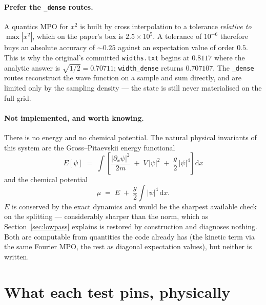 \documentclass[11pt,a4paper]{article}
\newcommand{\code}[1]{\texttt{#1}}
\newcommand{\dd}{\mathrm{d}}
\begin{document}
\paragraph{Prefer the \code{\_dense} routes.}
A quantics MPO for $x^2$ is built by cross interpolation to a tolerance
\emph{relative to} $\max|x^2|$, which on the paper's box is $2.5\times10^5$. A
tolerance of $10^{-6}$ therefore buys an absolute accuracy of ${\sim}0.25$ against an
expectation value of order $0.5$. This is why the original's committed
\code{widths.txt} begins at $0.8117$ where the analytic answer is
$\sqrt{1/2} = 0.70711$; \code{width\_dense} returns $0.707107$. The \code{\_dense}
routes reconstruct the wave function on a sample and sum directly, and are limited
only by the sampling density --- the state is still never materialised on the full
grid.

\paragraph{Not implemented, and worth knowing.}
There is no energy and no chemical potential. The natural physical invariants of this
system are the Gross--Pitaevskii energy functional
\begin{equation}
  E[\psi] \;=\; \int \left[ \frac{|\partial_x \psi|^2}{2m}
    \;+\; V\,|\psi|^2 \;+\; \frac{g}{2}\,|\psi|^4 \right] \dd x
  \label{eq:energy}
\end{equation}
and the chemical potential
\begin{equation}
  \mu \;=\; E \;+\; \frac{g}{2}\int |\psi|^4 \,\dd x .
\end{equation}
$E$ is conserved by the exact dynamics and would be the sharpest available check on
the splitting --- considerably sharper than the norm, which as
Section~\ref{sec:lowpass} explains is restored by construction and diagnoses nothing.
Both are computable from quantities the code already has (the kinetic term via the
same Fourier MPO, the rest as diagonal expectation values), but neither is written.

\section{What each test pins, physically}
\end{document}
